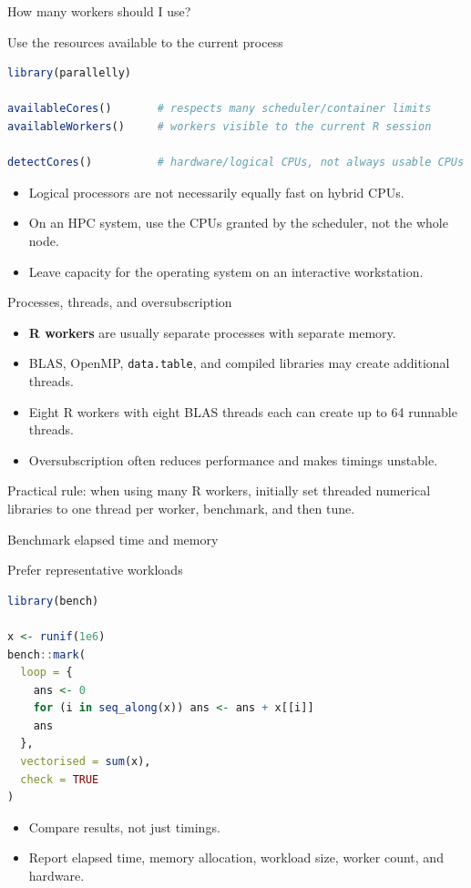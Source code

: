 \begin{frame}[fragile]{How many workers should I use?}
\begin{block}{Use the resources available to the current process}
\begin{lstlisting}[language=R]
library(parallelly)

availableCores()       # respects many scheduler/container limits
availableWorkers()     # workers visible to the current R session

detectCores()          # hardware/logical CPUs, not always usable CPUs
\end{lstlisting}
\end{block}
\begin{itemize}
  \item Logical processors are not necessarily equally fast on hybrid CPUs.
  \item On an HPC system, use the CPUs granted by the scheduler, not the whole node.
  \item Leave capacity for the operating system on an interactive workstation.
\end{itemize}
\end{frame}

\begin{frame}{Processes, threads, and oversubscription}
\begin{itemize}
  \item \textbf{R workers} are usually separate processes with separate memory.
  \item BLAS, OpenMP, \texttt{data.table}, and compiled libraries may create additional threads.
  \item Eight R workers with eight BLAS threads each can create up to 64 runnable threads.
  \item Oversubscription often reduces performance and makes timings unstable.
\end{itemize}
\vspace{0.2cm}
Practical rule: when using many R workers, initially set threaded numerical libraries to one thread per worker, benchmark, and then tune.
\end{frame}

\begin{frame}[fragile]{Benchmark elapsed time and memory}
\begin{block}{Prefer representative workloads}
\begin{lstlisting}[language=R]
library(bench)

x <- runif(1e6)
bench::mark(
  loop = {
    ans <- 0
    for (i in seq_along(x)) ans <- ans + x[[i]]
    ans
  },
  vectorised = sum(x),
  check = TRUE
)
\end{lstlisting}
\end{block}
\begin{itemize}
  \item Compare results, not just timings.
  \item Report elapsed time, memory allocation, workload size, worker count, and hardware.
\end{itemize}
\end{frame}

